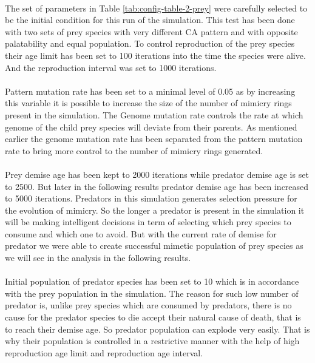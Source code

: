 \paragraph{}
The set of parameters in Table \ref{tab:config-table-2-prey} were carefully selected to be the initial condition for this run of the simulation. This test has been done with two sets of prey species with very different CA pattern and with opposite palatability and equal population. To control reproduction of the prey species their age limit has been set to 100 iterations into the time the species were alive. And the reproduction interval was set to 1000 iterations.

\paragraph{}
Pattern mutation rate has been set to a minimal level of 0.05 as by increasing this variable it is possible to increase the size of the number of mimicry rings present in the simulation. The Genome mutation rate controls the rate at which genome of the child prey species will deviate from their parents. As mentioned earlier the genome mutation rate has been separated from the pattern mutation rate to bring more control to the number of mimicry rings generated.

\paragraph{}
Prey demise age has been kept to 2000 iterations while predator demise age is set to 2500. But later in the following results predator demise age has been increased to 5000 iterations. Predators in this simulation generates selection pressure for the evolution of mimicry. So the longer a predator is present in the simulation it will be making intelligent decisions in term of selecting which prey species to consume and which one to avoid. But with the current rate of demise for predator we were able to create successful mimetic population of prey species as we will see in the analysis in the following results.

\paragraph{}
Initial population of predator species has been set to 10 which is in accordance with the prey population in the simulation. The reason for such low number of predator is, unlike prey species which are consumed by predators, there is no cause for the predator species to die accept their natural cause of death, that is to reach their demise age. So predator population can explode very easily. That is why their population is controlled in a restrictive manner with the help of high reproduction age limit and reproduction age interval.

